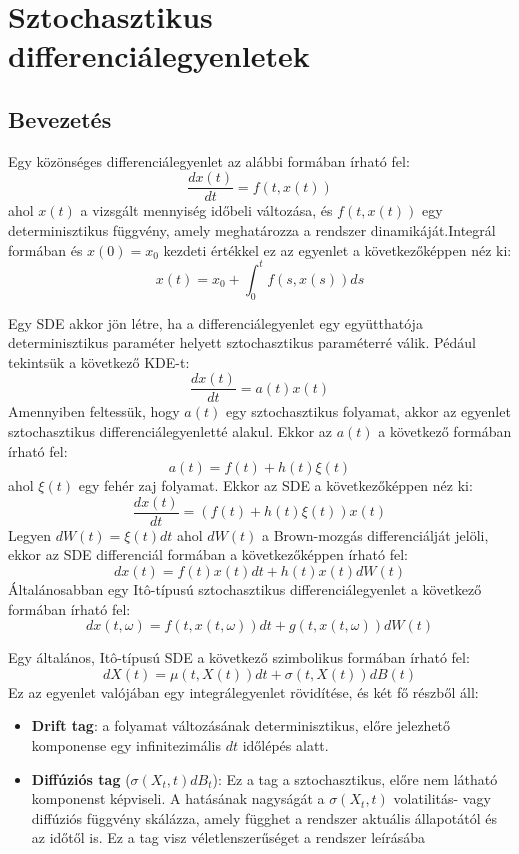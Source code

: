 \documentclass[12pt, a4paper]{article}
\begin{document}
\section{Sztochasztikus differenciálegyenletek}

\subsection{Bevezetés}

Egy közönséges differenciálegyenlet az alábbi formában írható fel:
\[
\frac{dx(t)}{dt} = f(t, x(t))
\]
ahol $x(t)$ a vizsgált mennyiség időbeli változása, és $f(t, x(t))$ egy determinisztikus függvény, amely meghatározza a rendszer dinamikáját.Integrál formában és $x(0) = x_0$ kezdeti értékkel ez az egyenlet a következőképpen néz ki:
\[
x(t) = x_0 + \int_0^t f(s, x(s)) ds
\]

Egy SDE akkor jön létre, ha a differenciálegyenlet egy együtthatója determinisztikus paraméter helyett sztochasztikus paraméterré válik.  Pédául tekintsük a következő KDE-t:
\[
\frac{dx(t)}{dt} = a(t)x(t)
\]
Amennyiben feltessük, hogy $a(t)$ egy sztochasztikus folyamat, akkor az egyenlet sztochasztikus differenciálegyenletté alakul. Ekkor az $a(t)$ a következő formában írható fel:
\[
a(t) = f(t) + h(t)\xi(t)
\]
ahol $\xi(t)$ egy fehér zaj folyamat. Ekkor az SDE a következőképpen néz ki:
\[
\frac{dx(t)}{dt} = \left( f(t) + h(t)\xi(t) \right) x(t)
\]
Legyen $dW(t) = \xi(t)dt$ ahol $dW(t)$ a Brown-mozgás differenciálját jelöli, ekkor az SDE differenciál formában a következőképpen írható fel:
\[
dx(t) = f(t)x(t)dt + h(t)x(t)dW(t)
\]
Általánosabban egy Itô-típusú sztochasztikus differenciálegyenlet a következő formában írható fel:
\[
dx(t,\omega) = f(t, x(t,\omega))dt + g(t, x(t,\omega))dW(t)
\]

Egy általános, Itô-típusú SDE a következő szimbolikus formában írható fel:
\[
dX(t) = \mu(t, X(t))dt + \sigma(t, X(t))dB(t)
\]
Ez az egyenlet valójában egy integrálegyenlet rövidítése, és két fő részből áll:
\begin{itemize}
    \item \textbf{Drift tag}: a folyamat változásának determinisztikus, előre jelezhető komponense egy infinitezimális $dt$ időlépés alatt.
    \item \textbf{Diffúziós tag} ($\sigma(X_t, t)dB_t$): Ez a tag a sztochasztikus, előre nem látható komponenst képviseli. A hatásának nagyságát a $\sigma(X_t, t)$ volatilitás- vagy diffúziós függvény skálázza, amely függhet a rendszer aktuális állapotától és az időtől is. Ez a tag visz véletlenszerűséget a rendszer leírásába
\end{itemize}
\newpage
\end{document}
